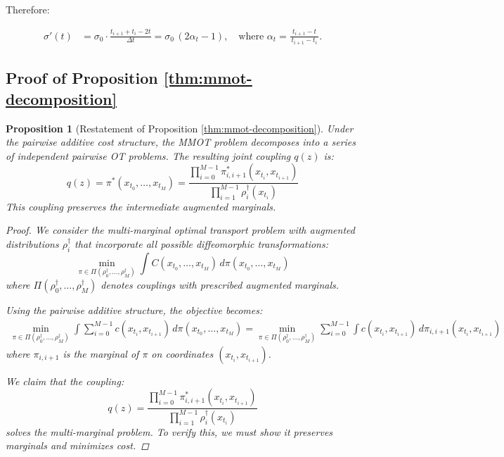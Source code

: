 \documentclass[twoside]{article}
\newtheorem*{manualproposition}{Proposition}
\begin{document}
Therefore:

\begin{align}
\sigma'(t) &= \sigma_0 \cdot \frac{t_{i+1} + t_{i} - 2t}{\Delta t} =\sigma_0\,(2\alpha_t-1), \quad \text{where } \alpha_t=\frac{t_{i+1}-t}{\,t_{i+1}-t_i\,}.
\end{align}

\subsection{Proof of Proposition \ref{thm:mmot-decomposition}}
\label{app:theory_proof}
\begin{manualproposition}[Restatement of Proposition \ref{thm:mmot-decomposition}]
Under the pairwise additive cost structure, the MMOT problem decomposes into a series of independent pairwise OT problems. The resulting joint coupling $q(z)$ is:
\begin{equation}
q(z) = \pi^{*}(x_{t_0}, \ldots, x_{t_M}) = \frac{\prod_{i=0}^{M-1} \pi_{i,i+1}^{*}(x_{t_i}, x_{t_{i+1}})}{\prod_{i=1}^{M-1} \rho_i^{\dagger}(x_{t_i})}
\end{equation}
This coupling preserves the intermediate augmented marginals.
\label{app:multi-marginal-proof}
\begin{proof}
We consider the multi-marginal optimal transport problem with augmented distributions $\rho_i^{\dagger}$ that incorporate all possible diffeomorphic transformations:
\begin{equation}
\min_{\pi \in \Pi(\rho_0^{\dagger}, \ldots, \rho_M^{\dagger})} \int C(x_{t_0}, \ldots, x_{t_M}) \, d\pi(x_{t_0}, \ldots, x_{t_M})
\end{equation}
where $\Pi(\rho_0^{\dagger}, \ldots, \rho_M^{\dagger})$ denotes couplings with prescribed augmented marginals.

Using the pairwise additive structure, the objective becomes:
\begin{align}
\min_{\pi \in \Pi(\rho_0^{\dagger}, \ldots, \rho_M^{\dagger})} \int \sum_{i=0}^{M-1} c(x_{t_i}, x_{t_{i+1}}) \, d\pi(x_{t_0}, \ldots, x_{t_M})
= \min_{\pi \in \Pi(\rho_0^{\dagger}, \ldots, \rho_M^{\dagger})} \sum_{i=0}^{M-1} \int c(x_{t_i}, x_{t_{i+1}}) \, d\pi_{i,i+1}(x_{t_i}, x_{t_{i+1}})
\end{align}
where $\pi_{i,i+1}$ is the marginal of $\pi$ on coordinates $(x_{t_i}, x_{t_{i+1}})$.

We claim that the coupling:
\begin{equation}
q(z) = \frac{\prod_{i=0}^{M-1} \pi_{i,i+1}^{*}(x_{t_i}, x_{t_{i+1}})}{\prod_{i=1}^{M-1} \rho_i^{\dagger}(x_{t_i})}
\end{equation}
solves the multi-marginal problem. To verify this, we must show it preserves marginals and minimizes cost.


\end{proof}
\end{manualproposition}
\end{document}
